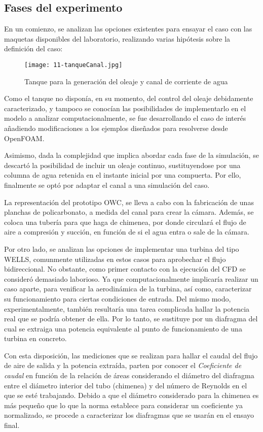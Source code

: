 \subsection{Fases del experimento}\label{header-n420}

En un comienzo, se analizan las opciones existentes para ensayar el caso
con las maquetas disponibles del laboratorio, realizando varias
hipótesis sobre la definición del caso:

\begin{figure}
\centering
\texttt{[image: 11-tanqueCanal.jpg]}
\caption{Tanque para la generación del oleaje y canal de corriente de agua}
\label{fig:tanqueCanal}
\end{figure}

Como el tanque no disponía, en su momento, del control del oleaje
debidamente caracterizado, y tampoco se conocían las posibilidades de
implementarlo en el modelo a analizar computacionalmente, se fue
desarrollando el caso de interés añadiendo modificaciones a los ejemplos
diseñados para resolverse desde OpenFOAM.

Asimismo, dada la complejidad que implica abordar cada fase de la
simulación, se descartó la posibilidad de incluir un oleaje continuo,
sustituyendose por una columna de agua retenida en el instante inicial
por una compuerta. Por ello, finalmente se optó por adaptar el canal a
una simulación del caso.

La representación del prototipo OWC, se lleva a cabo con la fabricación
de unas planchas de policarbonato, a medida del canal para crear la
cámara. Además, se coloca una tubería para que haga de chimenea, por
donde circulará el flujo de aire a compresión y succión, en función de
si el agua entra o sale de la cámara.

Por otro lado, se analizan las opciones de implementar una turbina del
tipo WELLS, comunmente utilizadas en estos casos para aprobechar el
flujo bidireccional. No obstante, como primer contacto con la ejecución
del CFD se consideró demasiado laborioso. Ya que computacionalmente
implicaría realizar un caso aparte, para venificar la aerodinámica de la
turbina, así como, caracterizar su funcionamiento para ciertas
condiciones de entrada. Del mismo modo, experimentalmente, también
resultaría una tarea complicada hallar la potencia real que se podría
obtener de ella. Por lo tanto, se sustituye por un diafragma del cual se
extraiga una potencia equivalente al punto de funcionamiento de una
turbina en concreto.

Con esta disposición, las mediciones que se realizan para hallar el
caudal del flujo de aire de salida y la potencia extraída, parten por
conocer el \emph{Coeficiente de caudal} en función de la relación de
áreas considerando el diámetro del diafragma entre el diámetro interior
del tubo (chimenea) y del número de Reynolds en el que se esté
trabajando. Debido a que el diámetro considerado para la chimenea es más
pequeño que lo que la norma establece para considerar un coeficiente ya
normalizado, se procede a caracterizar los diafragmas que se usarán en
el ensayo final.

